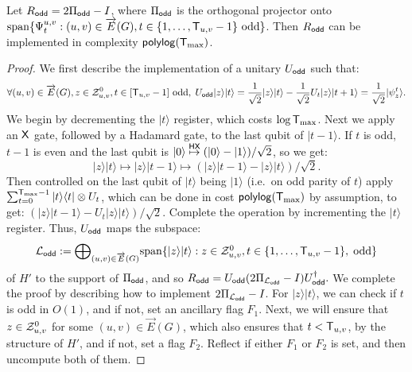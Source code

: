 \documentclass{article}
\def\ket#1{{\lvert}#1\rangle}
\def\bra#1{{\langle}#1\rvert}
\renewcommand{\>}{\rangle}
\newcommand{\<}{\langle}
\renewcommand{\(}{\left(}
\renewcommand{\)}{\right)}
\begin{document}
\begin{claim}\label{clm:fwk-odd-unitary}
Let $R_{\sf odd} =2\Pi_{\sf odd}-I$, where $\Pi_{\sf odd}$ is the orthogonal projector onto $\mathrm{span}\{\Psi_t^{u,v}:(u,v)\in\overrightarrow{E}(G), t\in\{1,\dots,{\sf T}_{u,v}-1\}\mbox{ odd}\}$. Then $R_{\sf odd}$ can be implemented in complexity ${\sf polylog}({\sf T}_{\max})$. 
\end{claim}
\begin{proof}
We first describe the implementation of a unitary $U_{\sf odd}$ such that:
\begin{equation*}
\forall (u,v)\in\overrightarrow{E}(G),z\in{\cal Z}_{u,v}^0, t\in[{\sf T}_{u,v}-1] \text{ odd}, \; U_{\sf odd}\ket{z}\ket{t} = \frac{1}{\sqrt{2}}\ket{z}\ket{t} - \frac{1}{\sqrt{2}}U_t\ket{z}\ket{t+1}    
= \frac{1}{\sqrt{2}}\ket{\psi_{z}^{t}}.\label{eq:U-S-0}
\end{equation*}
We begin by decrementing the $\ket{t}$ register, which costs $\log {\sf T}_{\max}$.
Next we apply an ${\sf X}$ gate, followed by a Hadamard gate, to the last qubit of $\ket{t-1}$. If $t$ is odd, $t-1$ is even and the last qubit is $\ket{0}\overset{{\sf HX}}{\mapsto} (\ket{0}-\ket{1})/\sqrt{2}$, so we get: 
$$\ket{z}\ket{t}\mapsto \ket{z}\ket{t-1}\mapsto \left(\ket{z}\ket{t-1}-\ket{z}\ket{t}\right)/\sqrt{2}.$$
Then controlled on the last qubit of $\ket{t}$ being $\ket{1}$ (i.e.~on odd parity of $t$) apply $\sum_{t=0}^{{\sf T}_{\max}-1}\ket{t}\bra{t}\otimes U_t$, which can be done in cost ${\sf polylog}({\sf T}_{\max})$ by assumption, to get:
$
\left(\ket{z}\ket{t-1}-U_t\ket{z}\ket{t}\right)/\sqrt{2}.
$
Complete the operation by incrementing the $\ket{t}$ register. Thus, $U_{\sf odd}$ maps the subspace:
$${\cal L}_{\sf odd}:=\textstyle{\displaystyle\bigoplus}_{(u,v)\in\overrightarrow{E}(G)}\mathrm{span}\{\ket{z}\ket{t}:z\in {\cal Z}_{u,v}^0,t\in\{1,\dots,{\sf T}_{u,v}-1\},\;\mbox{odd}\}$$
of $H'$ to the support of $\Pi_{\sf odd}$, and so
$R_{\sf odd}=U_{\sf odd}(2\Pi_{{\cal L}_{\sf odd}}-I)U_{\sf odd}^\dagger.$
We complete the proof by describing how to implement $2\Pi_{{\cal L}_{\sf odd}}-I$. For $\ket{z}\ket{t}$, we can check if $t$ is odd in $O(1)$, and if not, set an ancillary flag $F_1$. Next, we will ensure that $z\in {\cal Z}_{u,v}^0$ for some $(u,v)\in\overrightarrow{E}(G)$, which also ensures that $t<{\sf T}_{u,v}$, by the structure of $H'$, and if not, set a flag $F_2$. Reflect if either $F_1$ or $F_2$ is set, and then uncompute both of them. 
\end{proof}
                                                                     
\end{document}
